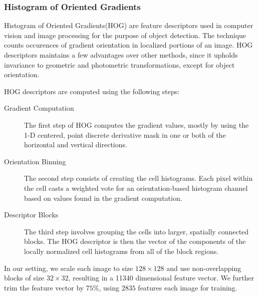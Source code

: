 \documentclass{article}
\begin{document}

\subsubsection{Histogram of Oriented Gradients}
Histogram of Oriented Gradients(HOG) are feature descriptors used in computer vision and image processing for the purpose of object detection. The technique counts occurences of gradient orientation in localized portions of an image. HOG descriptors maintains a few advantages over other methods, since it upholds invariance to geometric and photometric transformations, except for object orientation.\par
HOG descriptors are computed using the following steps:
\begin{description}
\item[Gradient Computation] The first step of HOG computes the gradient values, mostly by using the 1-D centered, point discrete derivative mask in one or both of the horizontal and vertical directions.
\item[Orientation Binning] The second step consists of creating the cell histograms. Each pixel within the cell casts a weighted vote for an orientation-based histogram channel based on values found in the gradient computation.
\item[Descriptor Blocks] The third step involves grouping the cells into larger, spatially connected blocks. The HOG descriptor is then the vector of the components of the locally normalized cell histograms from all of the block regions.
\end{description}
In our setting, we scale each image to size $128 \times 128$ and use non-overlapping blocks of size $32 \times 32$, resulting in a 11340 dimensional feature vector. We further trim the feature vector by $75\%$, using $2835$ features each image for training.
\end{document}

